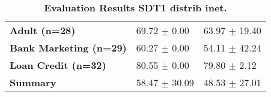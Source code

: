 \begin{table}[htb]
{\begin{tabular}{lll}
\textbf{Adult (n=28)                             } &        \phantom{0}69.72 $\pm$ \phantom{0}0.00 &                      \phantom{0}63.97 $\pm$ 19.40 \\
\textbf{Bank Marketing (n=29)                    } &        \phantom{0}60.27 $\pm$ \phantom{0}0.00 &                      \phantom{0}54.11 $\pm$ 42.24 \\
\textbf{Loan Credit (n=32)                       } &        \phantom{0}80.55 $\pm$ \phantom{0}0.00 &            \phantom{0}79.80 $\pm$ \phantom{0}2.12 \\
\midrule
\textbf{Summary                                  } &                  \phantom{0}58.47 $\pm$ 30.09 &                      \phantom{0}48.53 $\pm$ 27.01 \\
\bottomrule
\end{tabular}%
}
\caption{\textbf{Evaluation Results SDT1 distrib inet.}}
\label{tab:eval-results}
\end{table}


